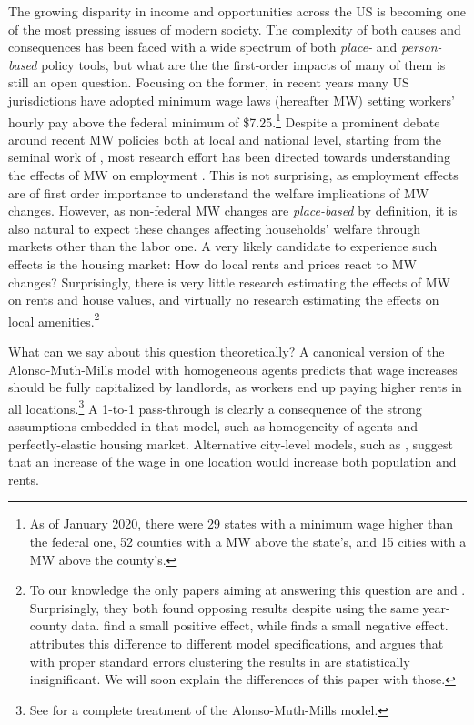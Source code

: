 
The growing disparity in income and opportunities across the US is becoming one of the most pressing issues of modern society. The complexity of both causes and consequences has been faced with a wide spectrum of both \textit{place-} and \textit{person-based} policy tools, but what are the the first-order impacts of many of them is still an open question. Focusing on the former, in recent years many US jurisdictions have adopted minimum wage laws (hereafter MW) setting workers' hourly pay above the federal minimum of \$7.25.\footnote{As of January 2020, there were 29 states with a minimum wage higher than the federal one, 52 counties with a MW above the state's, and 15 cities with a MW above the county's.} Despite a prominent debate around recent MW policies both at local and national level, starting from the seminal work of \textcite{card2000minimum}, most research effort has been directed towards understanding the effects of MW on employment \parencite[e.g,][]{dube2010minimum, neumark2006minimum, cengiz2019effect}. This is not surprising, as employment effects are of first order importance to understand the welfare implications of MW changes. However, as non-federal MW changes are \textit{place-based} by definition, it is also natural to expect these changes affecting households' welfare through markets other than the labor one. A very likely candidate to experience such effects is the housing market: How do local rents and prices react to MW changes? Surprisingly, there is very little research estimating the effects of MW on rents and house values, and virtually no research estimating the effects on local amenities.\footnote{To our knowledge the only papers aiming at answering this question are \textcite{yamagishi2019minimum} and \textcite{tidemann2018mw}. Surprisingly, they both found opposing results despite using the same year-county data. \textcite{yamagishi2019minimum} find a small positive effect, while \textcite{tidemann2018mw} finds a small negative effect. \textcite{yamagishi2019minimum} attributes this difference to different model specifications, and argues that with proper standard errors clustering the results in \textcite{tidemann2018mw} are statistically insignificant. We will soon explain the differences of this paper with those.}

 What can we say about this question theoretically? A canonical version of the Alonso-Muth-Mills model with homogeneous agents predicts that wage increases should be fully capitalized by landlords, as workers end up paying higher rents in all locations.\footnote{See \textcite{brueckner1987structure} for a complete treatment of the Alonso-Muth-Mills model.} A 1-to-1 pass-through is clearly a consequence of the strong assumptions embedded in that model, such as homogeneity of agents and perfectly-elastic housing market. Alternative city-level models, such as \textcite{klinemoretti2014}, suggest that an increase of the wage in one location would increase both population and rents.
 
